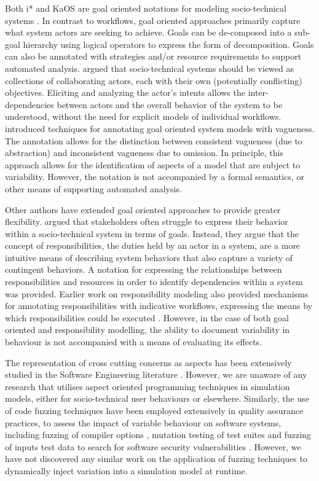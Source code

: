 \documentclass{llncs}
\begin{document}
Both i* \citep{yu1995social} and KaOS \citep{dardenne93goal} are goal oriented notations for modeling socio-technical
systems \cite{werneck2009goreistarkaos}.  In contrast to workflows, goal oriented approaches primarily capture what
system actors are seeking to achieve.  Goals can be de-composed into a sub-goal hierarchy using logical operators to
express the form of decomposition. Goals can also be annotated with strategies and/or resource requirements to support
automated analysis.  \citet{yu1995social} argued that socio-technical systems should be viewed as collections of
collaborating actors, each with their own (potentially conflicting) objectives.  Eliciting and analyzing the actor’s
intents allows the inter-dependencies between actors and the overall behavior of the system to be understood, without
the need for explicit models of individual workflows. \citet{herrmann1999vagueness} introduced techniques for annotating
goal oriented system models with vagueness.  The annotation allows for the distinction between consistent vagueness (due
to abstraction) and inconsistent vagueness due to omission.  In principle, this approach allows for the identification
of aspects of a model that are subject to variability.  However, the notation is not accompanied by a formal semantics,
or other means of supporting automated analysis.

Other authors have extended goal oriented approaches to provide greater flexibility. \citet{sommerville09deriving}
argued that stakeholders often struggle to express their behavior within a socio-technical system in terms of goals.
Instead, they argue that the concept of responsibilities, the duties held by an actor in a system, are a more intuitive
means of describing system behaviors that also capture a variety of contingent behaviors.  A notation for expressing the
relationships between responsibilities and resources in order to identify dependencies within a system was provided.
Earlier work on responsibility modeling also provided mechanisms for annotating responsibilities with indicative
workflows, expressing the means by which responsibilities could be executed \citep{dewsbury07responsibility}.  However,
in the case of both goal oriented and responsibility modelling, the ability to document variability in behaviour is not
accompanied with a means of evaluating its effects.

The representation of cross cutting concerns as aspects has been extensively studied in the Software Engineering
literature \citep{Ali2012Aspect}.  However, we are unaware of any research that utilises aspect oriented programming
techniques in simulation models, either for socio-technical user behaviours or elsewhere.  Similarly, the use of code
fuzzing techniques have been employed extensively in quality assurance practices, to assess the impact of variable
behaviour on software systems, including fuzzing of compiler options \citep{fuzzing-compiler}, mutation testing of test
suites \cite{demillo78hints} and fuzzing of inputs test data to search for software security vulnerabilities
\citep{takanen08fuzzing}.  However, we have not discovered any similar work on the application of fuzzing techniques to
dynamically inject variation into a simulation model at runtime.
\end{document}
